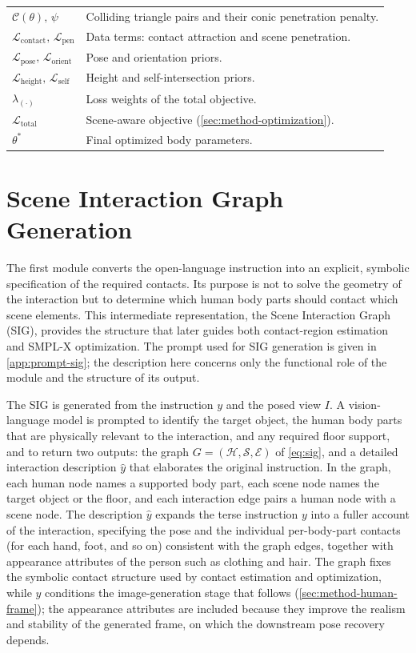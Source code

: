 \begin{longtable}{@{}>{\raggedright\arraybackslash\bfseries}p{}>{\raggedright\arraybackslash}p{}@{}}
    $\mathcal{C}(\theta),\, \psi$ & Colliding triangle pairs and their conic penetration penalty. \\
    $\mathcal{L}_{\mathrm{contact}},\, \mathcal{L}_{\mathrm{pen}}$ & Data terms: contact attraction and scene penetration. \\
    $\mathcal{L}_{\mathrm{pose}},\, \mathcal{L}_{\mathrm{orient}}$ & Pose and orientation priors. \\
    $\mathcal{L}_{\mathrm{height}},\, \mathcal{L}_{\mathrm{self}}$ & Height and self-intersection priors. \\
    $\lambda_{(\cdot)}$ & Loss weights of the total objective. \\
    $\mathcal{L}_{\mathrm{total}}$ & Scene-aware objective (\cref{sec:method-optimization}). \\
    $\theta^{\ast}$ & Final optimized body parameters. \\
\end{longtable}
\endgroup


\section{Scene Interaction Graph Generation}
\label{sec:method-sig}

The first module converts the open-language instruction into an explicit, symbolic specification of the required contacts. Its purpose is not to solve the geometry of the interaction but to determine which human body parts should contact which scene elements. This intermediate representation, the Scene Interaction Graph (SIG), provides the structure that later guides both contact-region estimation and SMPL-X optimization. The prompt used for SIG generation is given in \cref{app:prompt-sig}; the description here concerns only the functional role of the module and the structure of its output.

The SIG is generated from the instruction $y$ and the posed view $I$. A vision-language model is prompted to identify the target object, the human body parts that are physically relevant to the interaction, and any required floor support, and to return two outputs: the graph $G = (\mathcal{H}, \mathcal{S}, \mathcal{E})$ of \cref{eq:sig}, and a detailed interaction description $\hat{y}$ that elaborates the original instruction. In the graph, each human node names a supported body part, each scene node names the target object or the floor, and each interaction edge pairs a human node with a scene node. The description $\hat{y}$ expands the terse instruction $y$ into a fuller account of the interaction, specifying the pose and the individual per-body-part contacts (for each hand, foot, and so on) consistent with the graph edges, together with appearance attributes of the person such as clothing and hair. The graph fixes the symbolic contact structure used by contact estimation and optimization, while $\hat{y}$ conditions the image-generation stage that follows (\cref{sec:method-human-frame}); the appearance attributes are included because they improve the realism and stability of the generated frame, on which the downstream pose recovery depends.


